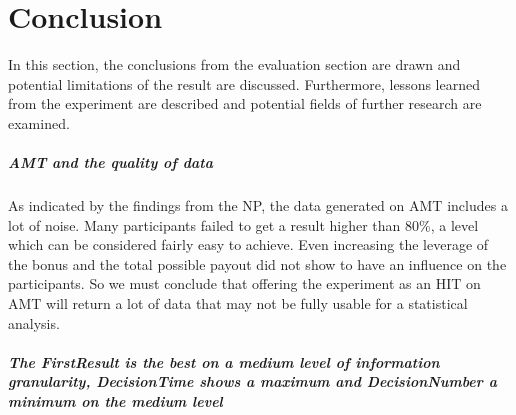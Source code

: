 
\chapter{Conclusion}
\label{ch:Conclusion}

In this section, the conclusions from the evaluation section are drawn and potential limitations of the result are discussed. Furthermore, lessons learned from the experiment are described and potential fields of further research are examined.

\paragraph{\acf{AMT} and the quality of data}
As indicated by the findings from the \acl{NP}, the data generated on \ac{AMT} includes a lot of noise. Many participants failed to get a result higher than 80\%, a level which can be considered fairly easy to achieve. Even increasing the leverage of the bonus and the total possible payout did not show to have an influence on the participants. So we must conclude that offering the experiment as an \ac{HIT} on \ac{AMT} will return a lot of data that may not be fully usable for a statistical analysis. 

\paragraph{The \textit{FirstResult} is the best on a medium level of information granularity, \textit{DecisionTime} shows a maximum and \textit{DecisionNumber} a minimum on the medium level}

